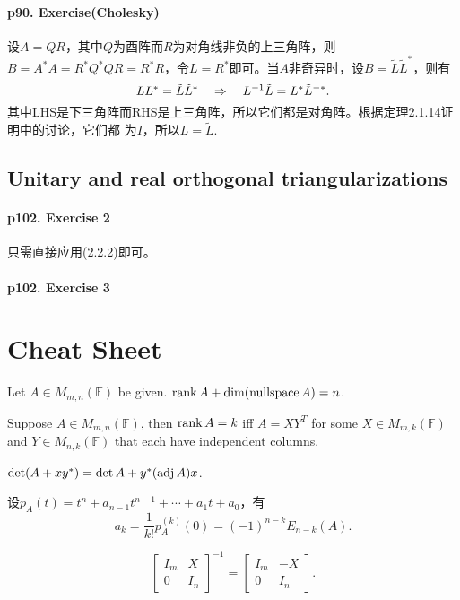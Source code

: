   \paragraph{p90. Exercise(Cholesky)}
    设$A=QR$，其中$Q$为酉阵而$R$为对角线非负的上三角阵，则$B=A^*A=R^*Q^*QR=R^*R$，令$L=
    R^*$即可。当$A$非奇异时，设$B=\tilde{L}\tilde{L}^*$，则有
    \[
      LL^*=\tilde{L}\tilde{L}^* \quad\Rightarrow\quad
      L^{-1}\tilde{L} = L^*\tilde{L}^{-*}.
    \]
    其中LHS是下三角阵而RHS是上三角阵，所以它们都是对角阵。根据定理2.1.14证明中的讨论，它们都
    为$I$，所以$L=\tilde{L}$.
  
\setcounter{subsection}{2}
\subsection{Unitary and real orthogonal triangularizations}
  \paragraph{p102. Exercise 2}
    只需直接应用(2.2.2)即可。

  \paragraph{p102. Exercise 3}



\newpage
\section{Cheat Sheet}
  \begin{thm}
    Let $A\in M_{m,n}(\mathbb{F})$ be given. $\operatorname{rank} A + \dim(\operatorname{nullspace} A) = n$.
  \end{thm}

  \begin{lemma}
    Suppose $A\in M_{m,n}(\mathbb{F})$, then $\operatorname{rank} A = k$ iff $A=XY^T$ for some
    $X\in M_{m,k}(\mathbb{F})$ and $Y\in M_{n,k}(\mathbb{F})$ that each have 
    independent columns.
  \end{lemma}

  \begin{lemma}
    $\det(A+xy^*) = \det A + y^*(\operatorname{adj} A)x$.
  \end{lemma}

  \begin{lemma}[特征多项式系数]
    设$p_A(t)=t^n+a_{n-1}t^{n-1}+\cdots+a_1t+a_0$，有
    \[
      a_k = \frac{1}{k!}p_A^{(k)}(0) = (-1)^{n-k}E_{n-k}(A).
    \]
  \end{lemma}

  \begin{lemma}
    \[
      \begin{bmatrix}
        I_m & X \\
        0   & I_n
      \end{bmatrix}^{-1}
      = \begin{bmatrix}
        I_m & -X \\
        0   & I_n
      \end{bmatrix}.
    \]
  \end{lemma}


